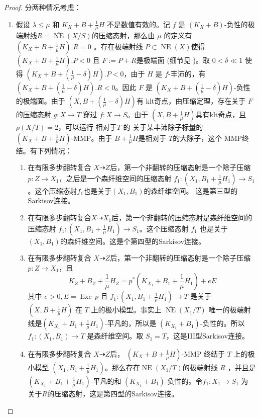 \begin{proof}
  分两种情况考虑：
  \begin{enumerate}
    \item 假设 $\lambda\leqslant \mu$ 和  $ K_X+B+\frac{1}{\mu}H $ 不是数值有效的。记 $ f $ 是 $ (K_X+B) $-负性的极端射线$ R= \overline{\operatorname{ NE }}(X/S) $的压缩态射，那么由 $\mu$ 的定义有$ (K_X+B+\frac{1}{\mu}H).R=0 $ 。存在极端射线 $ P \subset \overline{\operatorname{ NE }}(X) $使得$ (K_X+B+\frac{1}{\mu}H).P<0 $ 且 $ F:=P+R $是极端面  (细节见 \citet [5.4.2]{cortiFactoringBirationalMaps} )。取  $ 0<\delta\ll 1 $ 使得 $ (K_X+B+(\frac{1}{\mu}-\delta)H).P<0 $，由于  $H$ 是 $f$-丰沛的，有 $  (K_X+B+(\frac{1}{\mu}-\delta)H).R<0 $。因此 $ F $ 是 $  (K_X+B+(\frac{1}{\mu}-\delta)H) $-负性的极端面。由于 $ (X,B+(\frac{1}{\mu}-\delta)H) $有 klt奇点，由压缩定理，存在关于 $F$ 的压缩态射 $ g:X\to T $  穿过 $ f:X\to S $。由于  $ (X,B+\frac{1}{\mu}H) $具有klt奇点，且 $ \rho(X/T)=2 $，可以运行 相对于$T$ 的 关于某丰沛除子标量的 $ (K_X+B+\frac{1}{\mu}H) $-MMP。由于 $ B+\frac{1}{\mu}H $是相对于 $T$的大除子，这个 MMP终结。有下列情况：
    \begin{enumerate}
      \item 在有限多步翻转复合 $ X\dashrightarrow Z $后，第一个非翻转的压缩态射是一个除子压缩 $ p:Z\to X_1 $，之后是一个森纤维空间的压缩态射 $f_{1}:(X_{1},B_{1}+\frac{1}{\mu}H_{1})\to S_1$。这个压缩态射$f_1$也是关于$(X_{1},B_{1})$的森纤维空间。
      这是第三型的Sarkisov连接。
      \item 在有限多步翻转复合$ X\dashrightarrow X_1 $后，第一个非翻转的压缩态射是森纤维空间的压缩态射 $ f_1:(X_1,B_1+\frac{1}{\mu}H_1)\to S_{1} $。这个压缩态射 $f_1$ 也是关于 $(X_{1},B_{1})$的森纤维空间。这是个第四型的Sarkisov连接。
      \item 在有限多步翻转复合 $ X\dashrightarrow Z $后，第一个非翻转的压缩态射是一个除子压缩 $ p:Z\to X_1 $，且
            \[ K_Z+B_Z+\frac{1}{\mu}H_Z=p^*(K_{X_1}+B_1+\frac{1}{\mu}H_1)+eE \]
            其中 $ e>0 ,E=\operatorname{Exc}\,p$ 且  $f_{1}: (X_1,B_1+\frac{1}{\mu}H_1) \to T$ 是关于 $(X,B+\frac{1}{\mu}H)$ 在 $T$ 上的极小模型。事实上  $ \overline{\operatorname{NE}}(X_1/T) $ 唯一的极端射线是$ (K_{X_1}+B_1+\frac{1}{\mu}H_1) $-平凡的，所以是 $ (K_{X_1}+B_1) $-负性的。所以 $ f_1:(X_1, B_1)\to T $ 是森纤维空间。取 $ S_1=T $，这是III型Sarkisov连接。
      \item 在有限多步翻转复合 $ X\dashrightarrow Z $后，  $(K_{X}+B+\frac{1}{\mu}H)$-MMP 终结于 $T$ 上的极小模型 $ (X_1,B_1+\frac{1}{\mu}H_1) $。那么存在$ \overline{\operatorname{NE}}(X_1/T) $的极端射线 $R$ ，并且是 $ (K_{X_1}+B_1+\frac{1}{\mu}H_1) $-平凡的和 $ (K_{X_1}+B_1) $-负性的。令$ f_1:X_1\to S_1 $ 为 关于$R$的压缩态射，这是第四型的Sarkisov连接。

\end{enumerate}
\end{enumerate}
\end{proof}
